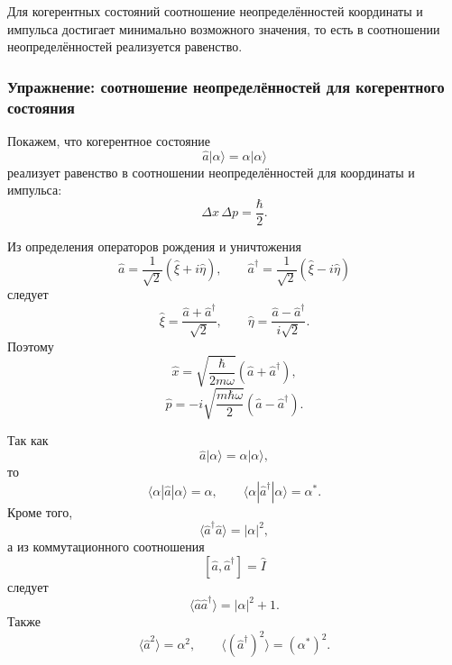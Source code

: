 \documentclass[12pt,a4paper]{article}
\begin{document}
Для когерентных состояний соотношение неопределённостей координаты и
импульса достигает минимально возможного значения, то есть в
соотношении неопределённостей реализуется равенство.

\subsubsection{Упражнение: соотношение неопределённостей для когерентного состояния}

Покажем, что когерентное состояние
\[
    \hat a|\alpha\rangle=\alpha|\alpha\rangle
\]
реализует равенство в соотношении неопределённостей для координаты и
импульса:
\[
    \Delta x\,\Delta p=\frac{\hbar}{2}.
\]

Из определения операторов рождения и уничтожения
\[
    \hat a
    =
    \frac{1}{\sqrt2}
    \left(
        \hat\xi+i\hat\eta
    \right),
    \qquad
    \hat a^\dagger
    =
    \frac{1}{\sqrt2}
    \left(
        \hat\xi-i\hat\eta
    \right)
\]
следует
\[
    \hat\xi
    =
    \frac{\hat a+\hat a^\dagger}{\sqrt2},
    \qquad
    \hat\eta
    =
    \frac{\hat a-\hat a^\dagger}{i\sqrt2}.
\]
Поэтому
\[
    \boxed{
    \hat x
    =
    \sqrt{\frac{\hbar}{2m\omega}}
    \left(
        \hat a+\hat a^\dagger
    \right)
    },
\]
\[
    \boxed{
    \hat p
    =
    -i
    \sqrt{\frac{m\hbar\omega}{2}}
    \left(
        \hat a-\hat a^\dagger
    \right)
    }.
\]

Так как
\[
    \hat a|\alpha\rangle
    =
    \alpha|\alpha\rangle,
\]
то
\[
    \langle\alpha|\hat a|\alpha\rangle
    =
    \alpha,
    \qquad
    \langle\alpha|\hat a^\dagger|\alpha\rangle
    =
    \alpha^*.
\]
Кроме того,
\[
    \langle\hat a^\dagger\hat a\rangle
    =
    |\alpha|^2,
\]
а из коммутационного соотношения
\[
    [\hat a,\hat a^\dagger]=\hat I
\]
следует
\[
    \langle\hat a\hat a^\dagger\rangle
    =
    |\alpha|^2+1.
\]
Также
\[
    \langle\hat a^2\rangle=\alpha^2,
    \qquad
    \langle(\hat a^\dagger)^2\rangle=(\alpha^*)^2.
\]
\end{document}

